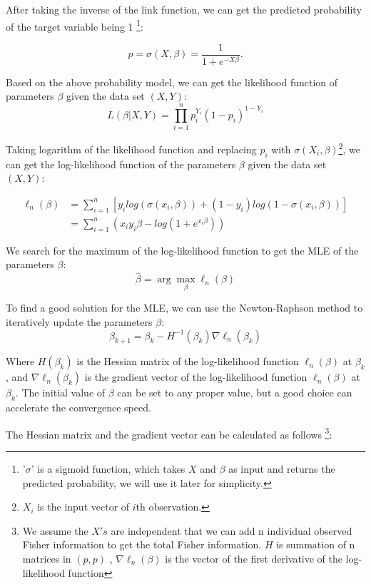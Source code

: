 After taking the inverse of the link function, we can get the predicted probability of the target variable being 1
\footnote{'$\sigma$' is a sigmoid function, which takes \(X\) and \(\beta\) as input and returns the predicted probability,
we will use it later for simplicity.}:

\[
p = \sigma(X, \beta) = \frac{1}{1+e^{-X\beta}}.
\]

Based on the above probability model, we can get the likelihood function 
of parameters \(\beta\) given the data set \((X, Y)\):
\[
L(\beta|X, Y) = \prod_{i=1}^n p_i^{Y_i} (1-p_i)^{1-Y_i} \tag{1-1}
\]


Taking logarithm of the likelihood function and replacing \(p_i\) with 
\(\sigma(X_i, \beta)\)\footnote{$X_i$ is the input vector of \(i\)th observation.}, 
we can get the log-likelihood function of the parameters \(\beta\) given the data set \((X, Y)\):

\begin{align*}
    \ell_n(\beta) 
    & = \sum_{i=1}^n [y_i log(\sigma(x_i, \beta)) + (1-y_i) log(1-\sigma(x_i, \beta))] \\
    & = \sum_{i=1}^n (x_iy_i \beta - log(1+e^{x_i\beta}))
\end{align*}


We search for the maximum of the log-likelihood function to get the MLE of the parameters \(\beta\):
\[
\hat{\beta} = \arg\max_{\beta} \ell_n(\beta)
\]

To find a good solution for the MLE, we can use the Newton-Raphson method to iteratively update the parameters \(\beta\):
\[
\beta_{k+1} = \beta_k - H^{-1}(\beta_k) \nabla \ell_n(\beta_k)
\]

Where \(H(\beta_k)\) is the Hessian matrix of the log-likelihood function \(\ell_n(\beta)\) at \(\beta_k\), 
and \(\nabla \ell_n(\beta_k)\) is the gradient vector of the log-likelihood function \(\ell_n(\beta)\) at \(\beta_k\).
The initial value of \(\beta\) can be set to any proper value, but a good choice can accelerate the convergence speed.

The Hessian matrix and the gradient vector can be calculated as follows
\footnote{We assume the \(X's\) are independent that we can add n individual observed 
Fisher information to get the total Fisher information. \(H\) is summation of n matrices in \((p, p)\) ,
$\nabla \ell_n(\beta)$ is the vector of the first derivative of the log-likelihood function}:

